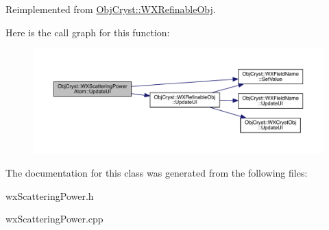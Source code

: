 Reimplemented from \mbox{\hyperlink{class_obj_cryst_1_1_w_x_refinable_obj_acbf70975a79661a73a1ae3c39c9c3045}{Obj\+Cryst\+::\+W\+X\+Refinable\+Obj}}.

Here is the call graph for this function\+:
\nopagebreak
\begin{figure}[H]
\begin{center}
\leavevmode
\includegraphics[width=350pt]{class_obj_cryst_1_1_w_x_scattering_power_atom_abd8a32f23a0b29e45ae32e40f0fec212_cgraph}
\end{center}
\end{figure}


The documentation for this class was generated from the following files\+:\begin{DoxyCompactItemize}
\item 
wx\+Scattering\+Power.\+h\item 
wx\+Scattering\+Power.\+cpp\end{DoxyCompactItemize}
